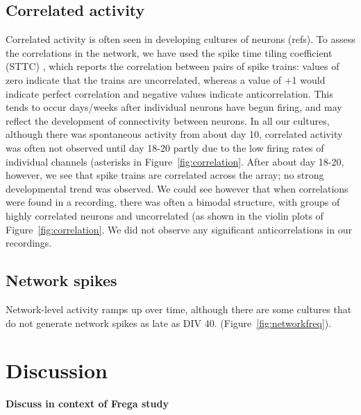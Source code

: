 \documentclass[doublespacing]{bmcart}
\begin{document}
\subsection*{Correlated activity}

Correlated activity is often seen in developing cultures of neurons
(refs).  To assess the correlations in the network, we have used the spike time tiling coefficient (STTC) \cite{Cutts2014}, which reports the correlation between pairs of spike trains: values of zero indicate that the trains are uncorrelated, whereas a value of +1 would indicate perfect correlation and negative values indicate anticorrelation.  This tends to occur days/weeks after individual neurons have
begun firing, and may reflect the development of connectivity between
neurons.  In all our cultures, although there was spontaneous activity
from about day 10, correlated activity was often not observed until
day 18-20 partly due to the low firing rates of individual channels
(asterisks in Figure~\ref{fig:correlation}.  After about day 18-20,
however, we see that spike trains are correlated across the array; no
strong developmental trend was observed.  We could see however that
when correlations were found in a recording, there was often a bimodal
structure, with groups of highly correlated neurons and uncorrelated
(as shown in the violin plots of Figure~\ref{fig:correlation}.  We did not observe any significant anticorrelations in our recordings.

\subsection*{Network spikes}
Network-level activity ramps up over time, although there are some
cultures that do not generate network spikes as late as DIV 40.
(Figure~\ref{fig:networkfreq}).

\section*{Discussion}
\textbf{Discuss in context of Frega study}  \cite{Frega2019}
\vspace*{1cm}
\end{document}
